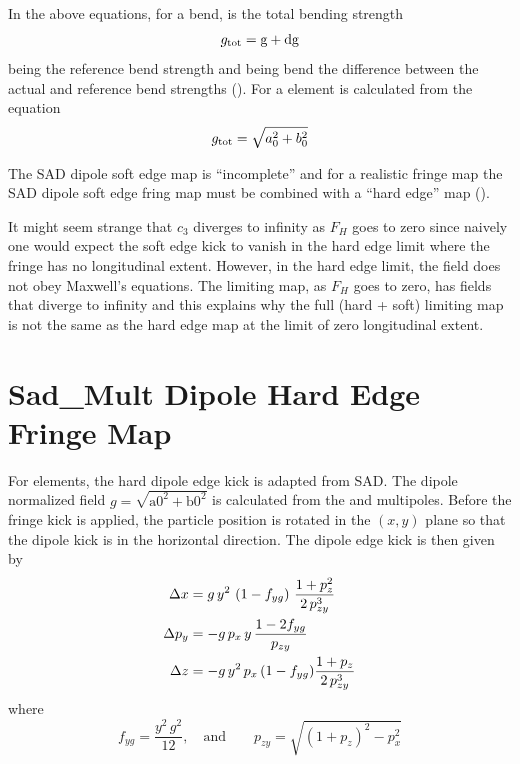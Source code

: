 {In the above equations, for a bend,  is the total bending strength
\begin{equation}
  g_{\text{tot}} = \text{g} + \text{dg}
\end{equation}
 being the reference bend strength and  being bend the difference between the actual
and reference bend strengths (). For a  element  is calculated
from the equation
\begin{equation}
  g_{\text{tot}} = \sqrt{a_0^2 + b_0^2}
\end{equation}

The SAD dipole soft edge map is ``incomplete'' and for a realistic fringe map the SAD dipole soft
edge fring map must be combined with a ``hard edge'' map ().

It might seem strange that $c_3$ diverges to infinity as $F_H$ goes to zero since naively one would
expect the soft edge kick to vanish in the hard edge limit where the fringe has no longitudinal
extent. However, in the hard edge limit, the field does not obey Maxwell's equations. The limiting
map, as $F_H$ goes to zero, has fields that diverge to infinity and this explains why the full (hard
+ soft) limiting map is not the same as the hard edge map at the limit of zero longitudinal extent.

\section{Sad\_Mult Dipole Hard Edge Fringe Map} 
\label{s:sad.mult.bend.fringe}

For  elements, the hard dipole edge kick is adapted from SAD. The dipole normalized
field $g = \sqrt{\text{a0}^2 + \text{b0}^2}$ is calculated from the  and 
multipoles. Before the fringe kick is applied, the particle position is rotated in the $(x,y)$ plane
so that the dipole kick is in the horizontal direction. The dipole edge kick is then given by
\begin{align}
  \Delta x &= g \, y^2 \, \left( 1 - f_{yg} \right) \, \frac{1 + p_z^2}{2 \, p_{zy}^3} \nonumber \\
  \Delta p_y &= -g \, p_x \, y \, \frac{1 - 2f_{yg}}{p_{zy}} \\
  \Delta z &= -g \, y^2 \, p_x \, (1 - f_{yg}) \frac{1 + p_z}{2 \, p_{zy}^3} \nonumber
\end{align}
where
\begin{equation}
  f_{yg} = \frac{y^2 \, g^2}{12}, \quad \text{and} \qquad
  p_{zy} = \sqrt{(1+p_z)^2 - p_x^2}
\end{equation}

}
